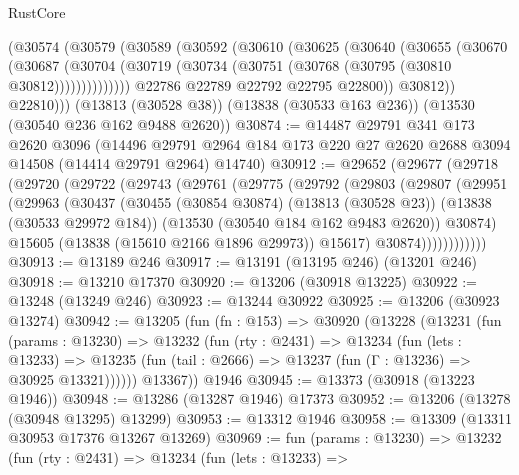 \begin{lexlean}{RustCore}
\begin{coremodule}
            (@30574
              (@30579
                (@30589
                  (@30592
                    (@30610
                      (@30625
                        (@30640
                          (@30655
                            (@30670
                              (@30687
                                (@30704
                                  (@30719
                                    (@30734 (@30751 (@30768 (@30795 (@30810 @30812))))))))))))))
                  @22786
                  @22789
                  @22792
                  @22795
                  @22800))
              @30812))
          @22810)))
    (@13813 (@30528 @38))
    (@13838 (@30533 @163 @236))
    (@13530 (@30540 @236 @162 @9488 @2620))
@30874 := @14487
    @29791
    @341
    @173
    @2620
    @3096
    (@14496 @29791 @2964 @184 @173 @220 @27 @2620 @2688 @3094 @14508 (@14414 @29791 @2964) @14740)
@30912 := @29652
    (@29677
      (@29718
        (@29720
          (@29722
            (@29743
              (@29761
                (@29775
                  (@29792
                    (@29803
                      (@29807
                        (@29951
                          (@29963
                            (@30437
                              (@30455
                                (@30854 @30874)
                                (@13813 (@30528 @23))
                                (@13838 (@30533 @29972 @184))
                                (@13530 (@30540 @184 @162 @9483 @2620))
                                @30874)
                              @15605
                              (@13838 (@15610 @2166 @1896 @29973))
                              @15617)
                            @30874))))))))))))
@30913 := @13189 @246
@30917 := @13191 (@13195 @246) (@13201 @246)
@30918 := @13210 @17370
@30920 := @13206 (@30918 @13225)
@30922 := @13248 (@13249 @246)
@30923 := @13244 @30922
@30925 := @13206 (@30923 @13274)
@30942 := @13205
    (fun (fn : @153) =>
    @30920
      (@13228
        (@13231
          (fun (params : @13230) =>
          @13232
            (fun (rty : @2431) =>
            @13234
              (fun (lets : @13233) =>
              @13235 (fun (tail : @2666) => @13237 (fun (Γ : @13236) => @30925 @13321))))))
        @13367))
    @1946
@30945 := @13373 (@30918 (@13223 @1946))
@30948 := @13286 (@13287 @1946) @17373
@30952 := @13206 (@13278 (@30948 @13295) @13299)
@30953 := @13312 @1946
@30958 := @13309 (@13311 @30953 @17376 @13267 @13269)
@30969 := fun (params : @13230) =>
  @13232
    (fun (rty : @2431) =>
    @13234
      (fun (lets : @13233) =>

\end{coremodule}
\end{lexlean}
